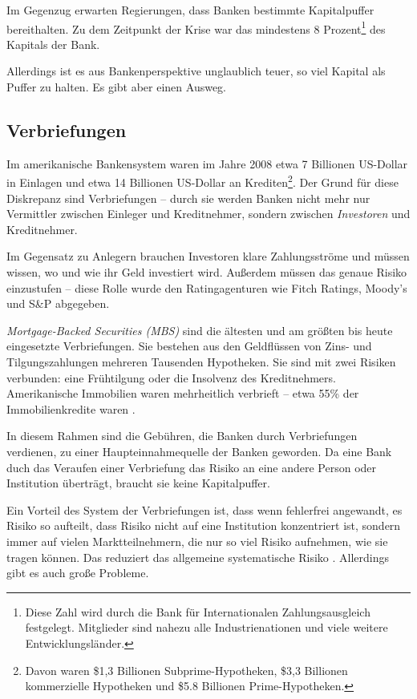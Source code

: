 \documentclass[a4paper,11pt]{report}
\begin{document}
Im Gegenzug erwarten Regierungen, dass Banken bestimmte Kapitalpuffer
bereithalten. Zu dem Zeitpunkt der Krise war das mindestens 8 Prozent\footnote{
  Diese Zahl wird durch die Bank für Internationalen Zahlungsausgleich
  festgelegt. Mitglieder sind nahezu alle Industrienationen und viele
  weitere Entwicklungsl\"ander.
} des Kapitals der Bank. \parencite[197--198]{acharyar}

Allerdings ist es aus Bankenperspektive unglaublich teuer, so viel
Kapital als Puffer zu halten. Es gibt aber einen Ausweg.

\subsection{Verbriefungen}
Im amerikanische Bankensystem waren im Jahre 2008 etwa 7 Billionen US-Dollar
in Einlagen und etwa 14 Billionen US-Dollar an Krediten\footnote{
  Davon waren \$1,3 Billionen Subprime-Hypotheken, \$3,3 Billionen kommerzielle
  Hypotheken und \$5.8 Billionen Prime-Hypotheken.}.
Der Grund f\"ur diese Diskrepanz sind Verbriefungen --
durch sie werden Banken nicht mehr nur Vermittler
zwischen Einleger und Kreditnehmer, sondern zwischen
\textit{Investoren} und Kreditnehmer.

Im Gegensatz zu Anlegern brauchen Investoren klare
Zahlungsstr\"ome und m\"ussen wissen, wo und wie 
ihr Geld investiert wird. Außerdem m\"ussen
das genaue Risiko einzustufen -- diese Rolle
wurde den Ratingagenturen wie Fitch Ratings, Moody's und S\&P
abgegeben.

\textit{Mortgage-Backed Securities (MBS)} sind die
\"altesten und am gr\"oßten bis heute eingesetzte
Verbriefungen. Sie bestehen aus den Geldfl\"ussen
von Zins- und Tilgungszahlungen
mehreren Tausenden Hypotheken. Sie sind mit zwei
Risiken verbunden: eine Fr\"uhtilgung
oder die Insolvenz des Kreditnehmers. 
Amerikanische Immobilien waren mehrheitlich verbrieft --
etwa 55\% der Immobilienkredite waren .


In diesem Rahmen sind die Geb\"uhren, die Banken
durch Verbriefungen verdienen, zu einer
Haupteinnahmequelle der Banken geworden. Da eine
Bank duch das Veraufen einer Verbriefung
das Risiko an eine andere Person oder Institution
\"ubertr\"agt, braucht sie keine Kapitalpuffer.

Ein Vorteil des System der Verbriefungen
ist, dass wenn fehlerfrei angewandt, es Risiko
so aufteilt, dass Risiko nicht auf eine Institution
konzentriert ist, sondern immer auf vielen Marktteilnehmern,
die nur so viel Risiko aufnehmen, wie sie tragen k\"onnen.
Das reduziert das allgemeine systematische Risiko \parencite[198--201]{acharyar}.
Allerdings gibt es auch große Probleme.
\end{document}
